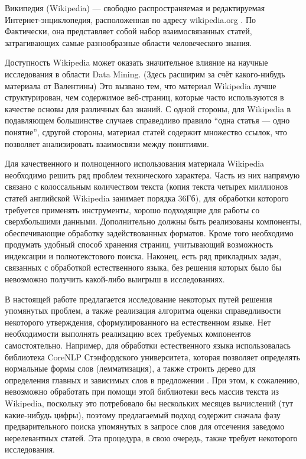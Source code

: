 Википедия (Wikipedia) --- свободно распространяемая и редактируемая 
Интернет-энциклопедия, расположенная по адресу wikipedia.org \cite{wikipedia}. По 
Фактически, она представляет собой набор взаимосвязанных статей, затрагивающих самые 
разнообразные области человеческого знания. 

Доступность Wikipedia может оказать значительное влияние на научные
исследования в области Data Mining. (Здесь расширим за счёт
какого-нибудь материала от Валентины) Это вызвано тем, что материал
Wikipedia лучше структурирован, чем содержимое веб-страниц, которые
часто используются в качестве основы для различных баз знаний. С одной
стороны, для Wikipedia в подавляющем большинстве случаев справедливо
правило ``одна статья --- одно понятие'', сдругой стороны, материал
статей содержит множество ссылок, что позволяет анализировать
взаимосвязи между понятиями. 

Для качественного и полноценного использования материала Wikipedia
необходимо решить ряд проблем технического характера. Часть из них
напрямую связано с колоссальным количеством текста (копия текста четырех 
миллионов статей английской Wikipedia занимает порядка 36Гб), 
для обработки которого требуется применять инструменты, хорошо
подходящие для работы со сверхбольшими данными. Дополнительно должны быть
реализованы компоненты, обеспечивающие обработку задействованных форматов. Кроме того 
необходимо продумать удобный способ хранения страниц, учитывающий 
возможность индексации и полнотекстового поиска. Наконец, есть ряд 
прикладных задач, связанных с обработкой естественного языка, без решения 
которых было бы невозможно получить какой-либо выигрыш в исследованиях.

В настоящей работе предлагается исследование некоторых путей решения
 упомянутых проблем, а также реализация алгоритма оценки
 справедливости некоторого утверждения, сформулированного на
 естественном языке.  Нет необходимости выполнять реализацию всех
 требуемых компонентов самостоятельно. Например, для обработки
 естественного языка использовалась библиотека CoreNLP Стэнфордского
 университета, которая позволяет определять нормальные формы слов
 (лемматизация), а также строить дерево для определения главных и
 зависимых слов в предложении \cite{fixme}. При этом, к сожалению, невозможно
 обработать при помощи этой библиотеки весь массив текста из
 Wikipedia, поскольку это потребовало бы нескольких месяцев вычислений
 (тут какие-нибудь цифры), поэтому предлагаемый подход содержит
 сначала фазу предварительного поиска упомянутых в запросе слов для
 отсечения заведомо нерелевантных статей. Эта процедура, в свою
 очередь, также требует некоторого исследования.

